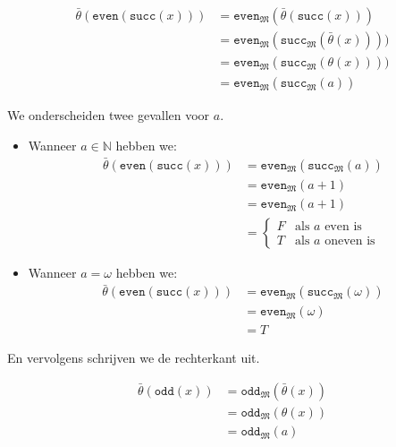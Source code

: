 \documentclass[a4paper,11pt]{article}
\begin{document}
\begin{itemize}
\begin{align*}
\bar \theta(\texttt{even}(\texttt{succ}(x))) &= \texttt{even}_{\mathfrak{M}}(\bar \theta(\texttt{succ}(x))) \\
                                             &= \texttt{even}_{\mathfrak{M}}(\texttt{succ}_{\mathfrak{M}}(\bar \theta(x)))) \\
                                             &= \texttt{even}_{\mathfrak{M}}(\texttt{succ}_{\mathfrak{M}}(\theta(x)))) \\
                                             &= \texttt{even}_{\mathfrak{M}}(\texttt{succ}_{\mathfrak{M}}(a))
\end{align*}

We onderscheiden twee gevallen voor $a$.

\begin{itemize}

\item
Wanneer $a \in \mathbb{N}$ hebben we:
\begin{align*}
\bar \theta(\texttt{even}(\texttt{succ}(x))) &= \texttt{even}_{\mathfrak{M}}(\texttt{succ}_{\mathfrak{M}}(a)) \\
                                             &= \texttt{even}_{\mathfrak{M}}(a+1) \\
                                             &= \texttt{even}_{\mathfrak{M}}(a+1) \\
                                             &= \begin{cases}
  F & \text{als $a$ even is} \\
  T & \text{als $a$ oneven is}
\end{cases}
\end{align*}

\item
Wanneer $a = \omega$ hebben we:
\begin{align*}
\bar \theta(\texttt{even}(\texttt{succ}(x))) &= \texttt{even}_{\mathfrak{M}}(\texttt{succ}_{\mathfrak{M}}(\omega)) \\
                                             &= \texttt{even}_{\mathfrak{M}}(\omega) \\
                                             &= T
\end{align*}

\end{itemize}

En vervolgens schrijven we de rechterkant uit.

\begin{align*}
\bar \theta(\texttt{odd}(x)) &= \texttt{odd}_{\mathfrak{M}}(\bar \theta(x)) \\
                             &= \texttt{odd}_{\mathfrak{M}}(\theta(x)) \\
                             &= \texttt{odd}_{\mathfrak{M}}(a)
\end{align*}


\end{itemize}
\end{document}
